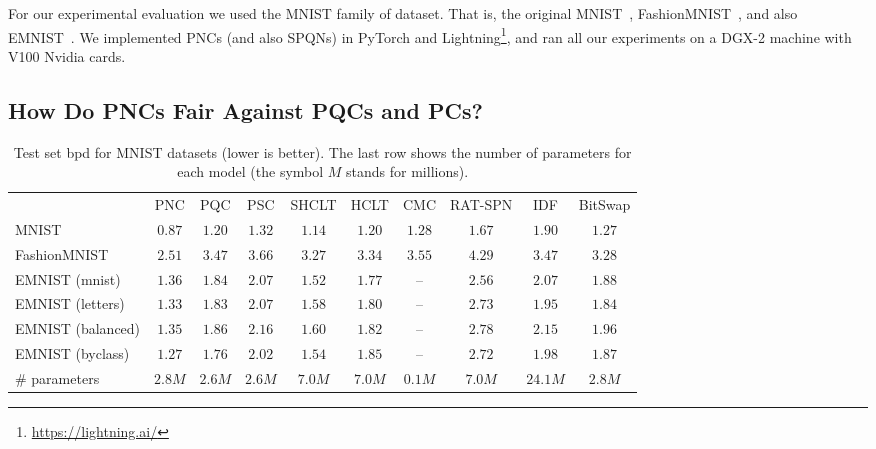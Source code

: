 \documentclass[letterpaper]{article} %
\begin{document}


For our experimental evaluation we used the MNIST family of dataset. That is, the original MNIST~\citep{deng2012mnist}, FashionMNIST~\citep{xiao2017fashion}, and also EMNIST~\citep{cohen2017emnist}.
We implemented PNCs (and also SPQNs) in PyTorch and Lightning\footnote{\url{https://lightning.ai/}}, and ran all our experiments on a DGX-2 machine with V100 Nvidia cards.

\subsection{How Do PNCs Fair Against PQCs and PCs?}
\label{sec:q1}





\begin{table*}[t]
	\footnotesize
	\centering
	\begin{tabular}{lccccccccc}
		                  & PNC             & PQC    & PSC    & SHCLT  & HCLT   & CMC    & RAT-SPN & IDF     & BitSwap \\
		\cmidrule(lr){2-4}
		\cmidrule(lr){5-10}
		MNIST             & $\mathbf{0.87}$ & $1.20$ & $1.32$ & $1.14$ & $1.20$ & $1.28$ & $1.67$  & $1.90$  & $1.27$  \\
		FashionMNIST      & $\mathbf{2.51}$ & $3.47$ & $3.66$ & $3.27$ & $3.34$ & $3.55$ & $4.29$  & $3.47$  & $3.28$  \\
		EMNIST (mnist)    & $\mathbf{1.36}$ & $1.84$ & $2.07$ & $1.52$ & $1.77$ & --     & $2.56$  & $2.07$  & $1.88$  \\
		EMNIST (letters)  & $\mathbf{1.33}$ & $1.83$ & $2.07$ & $1.58$ & $1.80$ & --     & $2.73$  & $1.95$  & $1.84$  \\
		EMNIST (balanced) & $\mathbf{1.35}$ & $1.86$ & $2.16$ & $1.60$ & $1.82$ & --     & $2.78$  & $2.15$  & $1.96$  \\
		EMNIST (byclass)  & $\mathbf{1.27}$ & $1.76$ & $2.02$ & $1.54$ & $1.85$ & --     & $2.72$  & $1.98$  & $1.87$  \\
		\midrule
		{\#} parameters   & $2.8M$          & $2.6M$ & $2.6M$ & $7.0M$ & $7.0M$ & $0.1M$ & $7.0M$  & $24.1M$ & $2.8M$  \\
	\end{tabular}
	\caption{Test set bpd for MNIST datasets (lower is better). The last row shows the number of parameters for each model (the symbol $M$ stands for millions).}
	\label{tab:mnist}
\end{table*}
\end{document}
